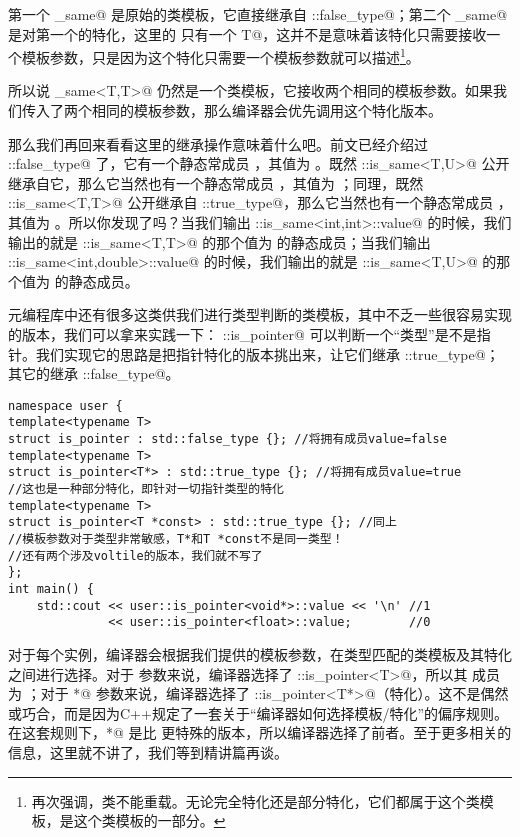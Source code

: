 第一个 \lstinline@is_same@ 是原始的类模板，它直接继承自 \lstinline@std::false_type@；第二个 \lstinline@is_same@ 是对第一个的特化，这里的 \lstinline@template@ 只有一个 \lstinline@typename T@，这并不是意味着该特化只需要接收一个模板参数，只是因为这个特化只需要一个模板参数就可以描述\footnote{再次强调，类不能重载。无论完全特化还是部分特化，它们都属于这个类模板，是这个类模板的一部分。}。\par
所以说 \lstinline@is_same<T,T>@ 仍然是一个类模板，它接收两个相同的模板参数。如果我们传入了两个相同的模板参数，那么编译器会优先调用这个特化版本。\par
那么我们再回来看看这里的继承操作意味着什么吧。前文已经介绍过 \lstinline@std::false_type@ 了，它有一个静态常成员 \lstinline@value@，其值为 \lstinline@false@。既然 \lstinline@user::is_same<T,U>@ 公开继承自它，那么它当然也有一个静态常成员 \lstinline@value@，其值为 \lstinline@false@；同理，既然 \lstinline@user::is_same<T,T>@ 公开继承自 \lstinline@std::true_type@，那么它当然也有一个静态常成员 \lstinline@value@，其值为 \lstinline@true@。所以你发现了吗？当我们输出 \lstinline@user::is_same<int,int>::value@ 的时候，我们输出的就是 \lstinline@user::is_same<T,T>@ 的那个值为 \lstinline@true@ 的静态成员；当我们输出 \lstinline@user::is_same<int,double>::value@ 的时候，我们输出的就是 \lstinline@user::is_same<T,U>@ 的那个值为 \lstinline@false@ 的静态成员。\par
元编程库中还有很多这类供我们进行类型判断的类模板，其中不乏一些很容易实现的版本，我们可以拿来实践一下：
\lstinline@std::is_pointer@ 可以判断一个``类型''是不是指针。我们实现它的思路是把指针特化的版本挑出来，让它们继承 \lstinline@std::true_type@；其它的继承 \lstinline@std::false_type@。
\begin{lstlisting}
namespace user {
template<typename T>
struct is_pointer : std::false_type {}; //将拥有成员value=false
template<typename T>
struct is_pointer<T*> : std::true_type {}; //将拥有成员value=true
//这也是一种部分特化，即针对一切指针类型的特化
template<typename T>
struct is_pointer<T *const> : std::true_type {}; //同上
//模板参数对于类型非常敏感，T*和T *const不是同一类型！
//还有两个涉及voltile的版本，我们就不写了
};
int main() {
    std::cout << user::is_pointer<void*>::value << '\n' //1
              << user::is_pointer<float>::value;        //0
\end{lstlisting}\par
对于每个实例，编译器会根据我们提供的模板参数，在类型匹配的类模板及其特化之间进行选择。对于 \lstinline@float@ 参数来说，编译器选择了 \lstinline@user::is_pointer<T>@，所以其 \lstinline@value@ 成员为 \lstinline@false@；对于 \lstinline@void*@ 参数来说，编译器选择了 \lstinline@user::is_pointer<T*>@（特化）。这不是偶然或巧合，而是因为C++规定了一套关于``编译器如何选择模板/特化''的偏序规则。在这套规则下，\lstinline@T*@ 是比 \lstinline@T@ 更特殊的版本，所以编译器选择了前者。至于更多相关的信息，这里就不讲了，我们等到精讲篇再谈。\par
